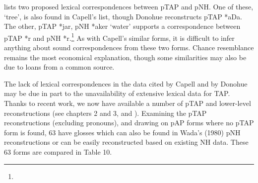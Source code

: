 \citet{Donohue2008} lists two proposed lexical correspondences between pTAP and pNH. One of these, `tree', is also found in Capell's list, though Donohue reconstructs pTAP *aDa. The other, pTAP *jar, pNH *aker `water' supports a correspondence between pTAP *r and pNH *r.\footnote{ }\textsuperscript{ } As with Capell's similar forms, it is difficult to infer anything about sound correspondences from these two forms. Chance resemblance remains the most economical explanation, though some similarities may also be due to loans from a common source.

The lack of lexical correspondences in the data cited by Capell and by Donohue may be due in part to the unavailability of extensive lexical data for TAP. Thanks to recent work, we now have available a number of pTAP and lower-level reconstructions (see chapters 2 and 3, and \citet{SchapperEtAl2012}). Examining the pTAP reconstructions (excluding pronouns), and drawing on pAP forms where no pTAP form is found, 63 have glosses which can also be found in Wada's (1980) pNH reconstructions or can be easily reconstructed based on existing NH data. These 63 forms are compared in Table 10. \nocite{Wada1980}



